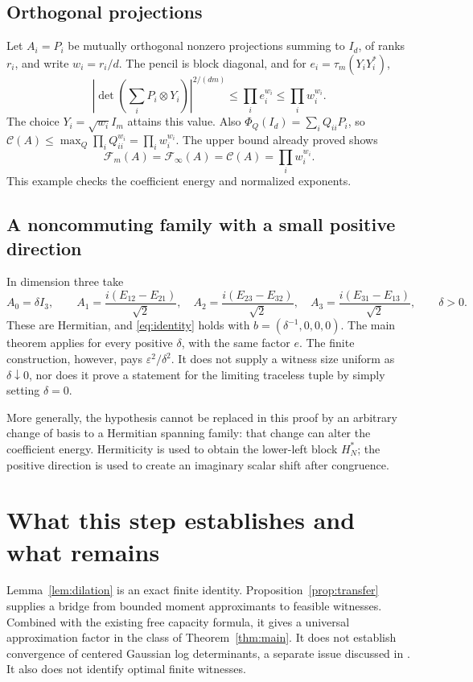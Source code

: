 \documentclass[11pt]{article}
\newcommand{\F}{\mathcal F}
\newcommand{\K}{\mathcal C}
\begin{document}
\subsection{Orthogonal projections}
Let $A_i=P_i$ be mutually orthogonal nonzero projections summing to $I_d$, of ranks $r_i$, and write $w_i=r_i/d$. The pencil is block diagonal, and for $e_i=\tau_m(Y_iY_i^*)$,
\[
 \left|\det\left(\sum_iP_i\otimes Y_i\right)\right|^{2/(dm)}
 \le\prod_i e_i^{w_i}\le\prod_i w_i^{w_i}.
\]
The choice $Y_i=\sqrt{w_i}I_m$ attains this value. Also $\Phi_Q(I_d)=\sum_iQ_{ii}P_i$, so $\K(A)\le\max_Q\prod_iQ_{ii}^{w_i}=\prod_iw_i^{w_i}$. The upper bound already proved shows
\[
 \F_m(A)=\F_\infty(A)=\K(A)=\prod_iw_i^{w_i}.
\]
This example checks the coefficient energy and normalized exponents.

\subsection{A noncommuting family with a small positive direction}
In dimension three take
\[
 A_0=\delta I_3,\qquad
 A_1=\frac{i(E_{12}-E_{21})}{\sqrt2},\quad
 A_2=\frac{i(E_{23}-E_{32})}{\sqrt2},\quad
 A_3=\frac{i(E_{31}-E_{13})}{\sqrt2},\qquad \delta>0.
\]
These are Hermitian, and \eqref{eq:identity} holds with $b=(\delta^{-1},0,0,0)$. The main theorem applies for every positive $\delta$, with the same factor $e$. The finite construction, however, pays $\varepsilon^2/\delta^2$. It does not supply a witness size uniform as $\delta\downarrow0$, nor does it prove a statement for the limiting traceless tuple by simply setting $\delta=0$.

More generally, the hypothesis cannot be replaced in this proof by an arbitrary change of basis to a Hermitian spanning family: that change can alter the coefficient energy. Hermiticity is used to obtain the lower-left block $H_N^*$; the positive direction is used to create an imaginary scalar shift after congruence.

\section{What this step establishes and what remains}
Lemma~\ref{lem:dilation} is an exact finite identity. Proposition~\ref{prop:transfer} supplies a bridge from bounded moment approximants to feasible witnesses. Combined with the existing free capacity formula, it gives a universal approximation factor in the class of Theorem~\ref{thm:main}. It does not establish convergence of centered Gaussian log determinants, a separate issue discussed in \cite{ms}. It also does not identify optimal finite witnesses.
\end{document}
